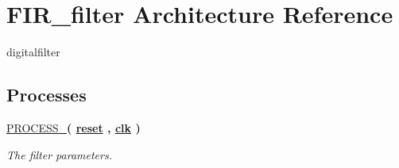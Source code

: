 \hypertarget{classdigitalfilter_1_1FIR__filter}{\section{F\-I\-R\-\_\-filter Architecture Reference}
\label{classdigitalfilter_1_1FIR__filter}
}


digitalfilter  


\subsection*{Processes}
 \begin{DoxyCompactItemize}
\item 
\hypertarget{classdigitalfilter_1_1FIR__filter_a7e91e75a2c6c203fc15a2560e69701cc}{\hyperlink{classdigitalfilter_1_1FIR__filter_a7e91e75a2c6c203fc15a2560e69701cc}{P\-R\-O\-C\-E\-S\-S\-\_}{\bfseries  ( {\bfseries {\bfseries \hyperlink{classdigitalfilter_aae5de5c5aebf7b54ecd36feaba217215}{reset}} \textcolor{vhdlchar}{ }\textcolor{vhdlchar}{ }\textcolor{vhdlchar}{ }} , {\bfseries {\bfseries \hyperlink{classdigitalfilter_a8120037e0ee47c35ba2d79242209c72e}{clk}} \textcolor{vhdlchar}{ }} )}}\label{classdigitalfilter_1_1FIR__filter_a7e91e75a2c6c203fc15a2560e69701cc}

\begin{DoxyCompactList}\small\item\em The filter parameters. \end{DoxyCompactList}\end{DoxyCompactItemize}
